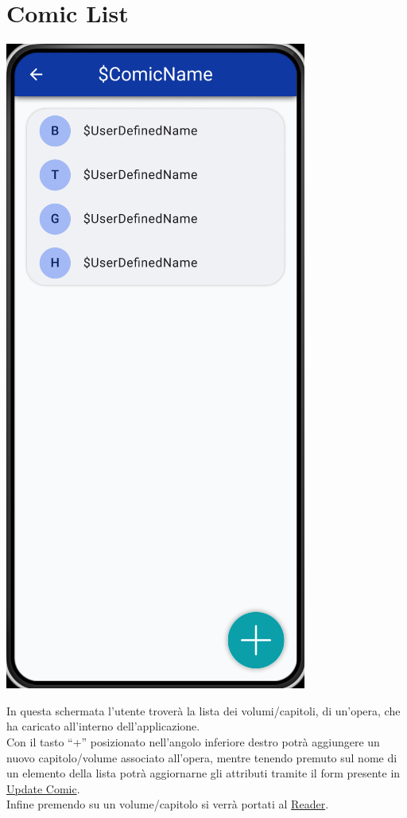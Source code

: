 \documentclass{report}
\begin{document}
\section{Comic List}\label{sec:comic_list}

\begin{center}
  \includegraphics[scale=0.4]{comic_list.png}
\end{center}

In questa schermata l'utente troverà la lista dei volumi/capitoli, di un'opera, che ha caricato all'interno dell'applicazione.\\
Con il tasto ``+'' posizionato nell'angolo inferiore destro potrà aggiungere un nuovo capitolo/volume associato all'opera, mentre tenendo premuto sul nome di un elemento della lista potrà aggiornarne gli attributi tramite il form presente in \hyperref[sec:update_comic]{Update Comic}.\\
Infine premendo su un volume/capitolo si verrà portati al \hyperref[sec:reader]{Reader}.
\end{document}
